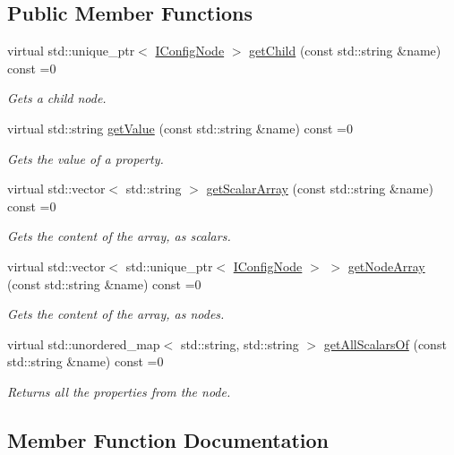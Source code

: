 \subsection*{Public Member Functions}
\begin{DoxyCompactItemize}
\item 
virtual std\+::unique\+\_\+ptr$<$ \hyperlink{classIConfigNode}{I\+Config\+Node} $>$ \hyperlink{classIConfigNode_a113e74aac6e8c62f5d5762b766f934e6}{get\+Child} (const std\+::string \&name) const =0
\begin{DoxyCompactList}\small\item\em Gets a child node. \end{DoxyCompactList}\item 
virtual std\+::string \hyperlink{classIConfigNode_ae32a49d812d3f98cbc048ab3cce5f7d6}{get\+Value} (const std\+::string \&name) const =0
\begin{DoxyCompactList}\small\item\em Gets the value of a property. \end{DoxyCompactList}\item 
virtual std\+::vector$<$ std\+::string $>$ \hyperlink{classIConfigNode_aaa66c9d23d521b5b5c9f5f6bf35087fb}{get\+Scalar\+Array} (const std\+::string \&name) const =0
\begin{DoxyCompactList}\small\item\em Gets the content of the array, as scalars. \end{DoxyCompactList}\item 
virtual std\+::vector$<$ std\+::unique\+\_\+ptr$<$ \hyperlink{classIConfigNode}{I\+Config\+Node} $>$ $>$ \hyperlink{classIConfigNode_a3a15562e0598f5bb105ddd006e298157}{get\+Node\+Array} (const std\+::string \&name) const =0
\begin{DoxyCompactList}\small\item\em Gets the content of the array, as nodes. \end{DoxyCompactList}\item 
virtual std\+::unordered\+\_\+map$<$ std\+::string, std\+::string $>$ \hyperlink{classIConfigNode_ae6abd34301fc7141963ef125117db0c5}{get\+All\+Scalars\+Of} (const std\+::string \&name) const =0
\begin{DoxyCompactList}\small\item\em Returns all the properties from the node. \end{DoxyCompactList}\end{DoxyCompactItemize}


\subsection{Member Function Documentation}
\mbox{\label{classIConfigNode_ae6abd34301fc7141963ef125117db0c5}} 

